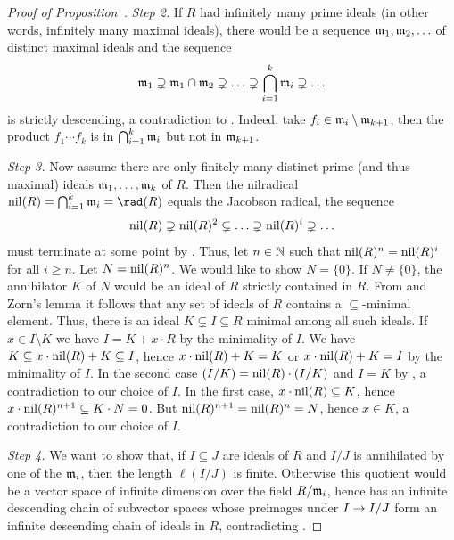 \documentclass[a4paper,parskip=half,numbers=enddot, DIV=12]{scrreprt}
\begin{document}
\begin{proof}[Proof of Proposition~]
    \emph{Step 2.} If $R$ had infinitely many prime ideals (in other words, infinitely many maximal ideals), there would be a sequence $\mathfrak{m}_1,\mathfrak{m}_2,\ldots$ of distinct maximal ideals and the sequence
    \begin{align*}
        \mathfrak{m}_1 \supsetneq \mathfrak{m}_1\cap\mathfrak{m}_2\supsetneq \ldots\supsetneq \bigcap_{i=1}^k \mathfrak{m}_i \supsetneq \ldots
    \end{align*}
    is strictly descending, a contradiction to . Indeed, take $f_i\in\mathfrak{m}_i\setminus \mathfrak{m}_{k+1}$, then the product $f_1\cdots f_k$ is in $\bigcap_{i=1}^k\mathfrak{m}_i$ but not in $\mathfrak{m}_{k+1}$.
    
    \emph{Step 3.} Now assume there are only finitely many distinct prime (and thus maximal) ideals $\mathfrak{m}_1, \ldots,\mathfrak{m}_k$ of $R$. Then the nilradical $\nil(R) = \bigcap_{i=1}^k \mm_i=\rad(R)$ equals the Jacobson radical, the sequence 
    \begin{align*}
    	\operatorname{nil}(R)\supsetneq\operatorname{nil}(R)^2\subsetneq \ldots\supsetneq \operatorname{nil}(R)^i\supsetneq\ldots 
    \end{align*}
    must terminate at some point by . Thus, let $n\in\mathbb{N}$ such that $\operatorname{nil}(R)^n = \operatorname{nil}(R)^i$ for all $i\geq n$. Let $N = \operatorname{nil}(R)^n$. We would like to show $N=\{0\}$. If $N\neq \{0\}$, the annihilator $K$ of $N$ would be an ideal of $R$ strictly contained in $R$. From  and Zorn's lemma it follows that any set of ideals of $R$ contains a $\subseteq$-minimal element. Thus, there is an ideal $K\subsetneq I\subseteq R$ minimal among all such ideals. If $x\in I\setminus K$ we have $I= K+x\cdot R$ by the minimality of $I$. We have $K\subseteq x\cdot \operatorname{nil}(R) + K \subseteq I$, hence $x\cdot  \operatorname{nil}(R) + K = K$ or $x\cdot \operatorname{nil}(R) +K = I$ by the minimality of $I$. In the second case $(I/K) = \operatorname{nil}(R)\cdot(I/K)$ and $I=K$ by \NAK, a contradiction to our choice of $I$. In the first case, $x\cdot \operatorname{nil}(R) \subseteq K$, hence $x\cdot \operatorname{nil}(R)^{n+1}\subseteq K\cdot N = 0$. But $\operatorname{nil}(R)^{n+1}= \operatorname{nil}(R)^n = N$, hence $x\in K$, a contradiction to our choice of $I$. 
    
    \emph{Step 4.} We want to show that, if $I\subseteq J$ are ideals of $R$ and $I/J$ is annihilated by one of the $\mathfrak{m}_i$, then the length $\ell(I/J)$ is finite. Otherwise this quotient would be a vector space of infinite dimension over the field $R/\mathfrak{m}_i$, hence has an infinite descending chain of subvector spaces whose preimages under $I\morphism I/J$ form an infinite descending chain of ideals in $R$, contradicting . 
    

\end{proof}
\end{document}
